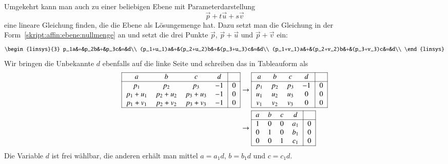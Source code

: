 Umgekehrt kann man auch zu einer beliebigen Ebene mit Parameterdarstellung
\[
\vec{p}+t\vec{u}+s\vec{v}
\]
eine lineare Gleichung finden, die die Ebene als Lösungemenge hat.
Dazu setzt man die Gleichung in der
Form~\eqref{skript:affin:ebene:nullmenge} an und setzt die drei
Punkte $\vec{p}$, $\vec{p}+\vec{u}$ und $\vec{p}+\vec{v}$ ein:
\[
\begin{linsys}{3}
p_1a&+&p_2b&+&p_3c&=&d\\
(p_1+u_1)a&+&(p_2+u_2)b&+&(p_3+u_3)c&=&d\\
(p_1+v_1)a&+&(p_2+v_2)b&+&(p_3+v_3)c&=&d\\
\end{linsys}
\]
Wir bringen die Unbekannte $d$ ebenfalls auf die linke Seite und schreiben
das in Tableauform als
\begin{align}
\begin{tabular}{|>{$}c<{$}>{$}c<{$}>{$}c<{$}>{$}c<{$}|>{$}c<{$}|}
\hline
a&b&c&d&\\
\hline
p_1&p_2&p_3&-1&0\\
p_1+u_1&p_2+u_2&p_3+u_3&-1&0\\
p_1+v_1&p_2+v_2&p_3+v_3&-1&0\\
\hline
\end{tabular}
&\rightarrow
\begin{tabular}{|>{$}c<{$}>{$}c<{$}>{$}c<{$}>{$}c<{$}|>{$}c<{$}|}
\hline
a&b&c&d&\\
\hline
p_1&p_2&p_3&-1&0\\
u_1&u_2&u_3& 0&0\\
v_1&v_2&v_3& 0&0\\
\hline
\end{tabular}
\label{skript:affin:ebene:abcd}
\\
&\rightarrow
\begin{tabular}{|>{$}c<{$}>{$}c<{$}>{$}c<{$}>{$}c<{$}|>{$}c<{$}|}
\hline
a&b&c&d&\\
\hline
1&0&0&a_1&0\\
0&1&0&b_1&0\\
0&0&1&c_1&0\\
\hline
\end{tabular}
\notag
\end{align}
Die Variable $d$ ist frei wählbar, die anderen erhält man mittel
$a=a_1d$, $b=b_1d$ und $c=c_1d$.

